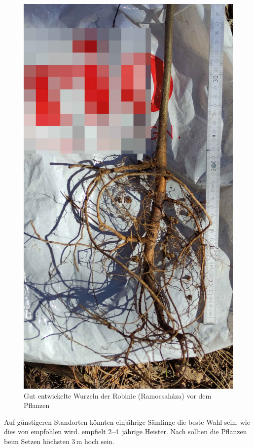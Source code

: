 \documentclass[twocolumn]{scrartcl}
\begin{document}
\begin{figure}[htbp]
  \centering
  \includegraphics[width=.9\linewidth]{./bild/wurzelRobinie}
  \caption{Gut entwickelte Wurzeln der Robinie (Ramocsaháza) vor dem Pflanzen}
  \label{fig:wurzelRobinie}
\end{figure}

Auf günstigeren Standorten könnten einjährige Sämlinge die beste Wahl
sein, wie dies von \citet{ciuvat2022robinieRumaenien} empfohlen wird.
\citet[S.~51]{fekete1931robinieErtragstafel} empfielt 2--4~jährige
Heister. Nach \citet{fuehrer2005robinie} sollten die Pflanzen beim
Setzen höchsten 3\,m hoch sein.
\end{document}
